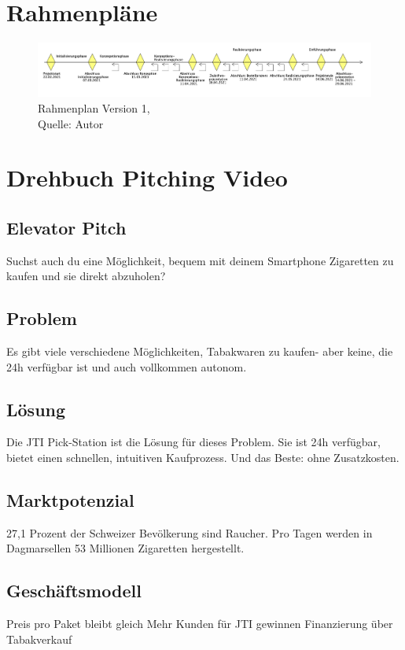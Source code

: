 \section{Rahmenpläne}\label{Rahmenplaene}
\begin{figure}[H]
    \centering
   \includegraphics[width=1\textwidth]{images/SoDa_Zeitstrahl_v1.png}
    \caption[SoDa Rahmenplan Version 1]{Rahmenplan Version 1,\\ Quelle: Autor}
    \label{img: SoDa Rahmenplan_v1}
\end{figure}
\section{Drehbuch Pitching Video}
\subsection{Elevator Pitch}
Suchst auch du eine Möglichkeit, bequem mit deinem Smartphone Zigaretten zu kaufen und sie direkt abzuholen? 

\subsection{Problem}
Es gibt viele verschiedene Möglichkeiten, Tabakwaren zu kaufen- aber keine, die 24h verfügbar ist und auch vollkommen autonom.

\subsection{Lösung}
Die JTI Pick-Station ist die Lösung für dieses Problem. Sie ist 24h verfügbar, bietet einen schnellen, intuitiven Kaufprozess. Und das Beste: ohne Zusatzkosten.  

\subsection{Marktpotenzial}
27,1 Prozent der Schweizer Bevölkerung sind Raucher. 
Pro Tagen werden in Dagmarsellen 53 Millionen Zigaretten hergestellt. 

\subsection{Geschäftsmodell}
Preis pro Paket bleibt gleich
Mehr Kunden für JTI gewinnen
Finanzierung über Tabakverkauf

